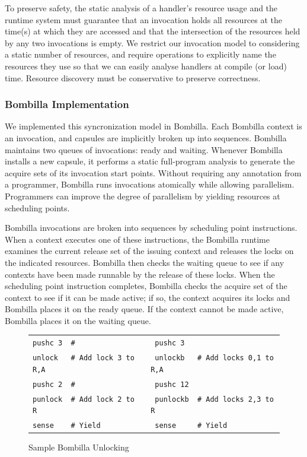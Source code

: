 \documentclass[10pt]{article}
\newcommand{\bomb}{Bombilla\xspace}
\begin{document}
To preserve safety, the static analysis of a handler's resource usage
and the runtime system must guarantee that an invocation holds all
resources at the time(s) at which they are accessed and that the
intersection of the resources held by any two invocations is empty. We
restrict our invocation model to considering a static number of
resources, and require operations to explicitly name the resources
they use so that we can easily analyse handlers at compile (or load)
time. Resource discovery must be conservative to preserve correctness.


\subsubsection{\bomb Implementation}


We implemented this syncronization model in \bomb. Each
\bomb context is an invocation, and capsules are implicitly
broken up into sequences. \bomb maintains two queues of
invocations: ready and waiting. Whenever \bomb installs a new
capsule, it performs a static full-program analysis to generate the
acquire sets of its invocation start points. Without requiring any
annotation from a programmer, \bomb runs invocations atomically
while allowing parallelism. Programmers can improve the degree of
parallelism by yielding resources at scheduling points.

\bomb invocations are broken into sequences by scheduling point
instructions. When a context executes one of these instructions, the
\bomb runtime examines the current release set of the issuing
context and releases the locks on the indicated resources. \bomb
then checks the waiting queue to see if any contexts have been made
runnable by the release of these locks. When the scheduling point
instruction completes, \bomb checks the acquire set of the
context to see if it can be made active; if so, the context acquires
its locks and \bomb places it on the ready queue. If the context
cannot be made active, \bomb places it on the waiting queue.

\begin{figure}
\centering
\tiny
\begin{tabular}{|l|l|}\hline
\verb;pushc 3  #                   ;&\verb; pushc 3 ;\\
\verb;unlock   # Add lock 3 to R,A ;&\verb; unlockb   # Add locks 0,1 to R,A;\\
\verb;pushc 2  #                   ;&\verb; pushc 12 ;\\
\verb;punlock  # Add lock 2 to R   ;&\verb; punlockb  # Add locks 2,3 to R;\\
\verb;sense    # Yield             ;&\verb; sense     # Yield;\\ \hline

\end{tabular}

\caption{Sample \bomb Unlocking}

\label{fig:locks}

\end{figure}
\end{document}

